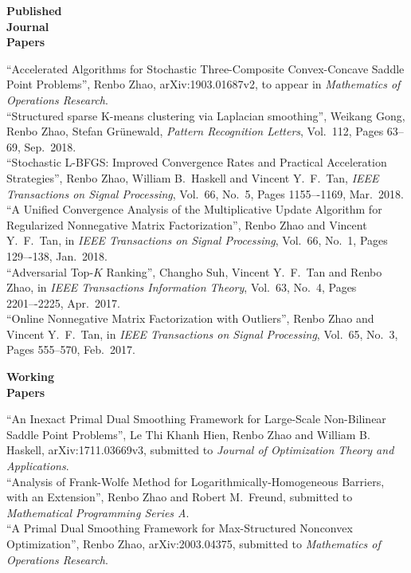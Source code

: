 \documentclass[11pt]{article}
\newcommand{\TSP}{IEEE Transactions on Signal Processing}
\newcommand{\TIT}{IEEE Transactions Information Theory}
\newcommand{\MOR}{Mathematics of Operations Research}
\newcommand{\MPA}{Mathematical Programming Series A}
\newcommand{\JOTA}{Journal of Optimization Theory and Applications}
\begin{document}
\begin{minipage}[t]{0.18\textwidth}
\textbf{Published\\ Journal \\Papers}
\end{minipage}
\begin{minipage}[t]{0.8\textwidth}
``Accelerated Algorithms for Stochastic Three-Composite Convex-Concave Saddle Point Problems'', {Renbo Zhao}, arXiv:1903.01687v2, to appear in {\em \MOR}.\\[.2cm]
``Structured sparse K-means clustering via Laplacian smoothing'', Weikang Gong, Renbo Zhao, Stefan Gr\"unewald, {\em Pattern Recognition Letters}, Vol.\ 112, Pages 63--69, Sep.\ 2018. \\[.2cm]
``Stochastic L-BFGS: Improved Convergence Rates and Practical Acceleration Strategies'', {Renbo Zhao}, William B.\ Haskell and Vincent Y.\ F.\ Tan,   {\em \TSP}, Vol.\ 66, No.\ 5, Pages 1155–-1169, Mar.\ 2018. %
\\[.2cm]
``A Unified Convergence Analysis of the Multiplicative Update Algorithm for Regularized Nonnegative Matrix Factorization'', {Renbo Zhao} and Vincent Y.\ F.\ Tan,  in {\em \TSP}, Vol.\ 66, No.\ 1, Pages 129–-138, Jan.\  2018. %
\\[.2cm]
``Adversarial Top-$K$ Ranking'', Changho Suh, Vincent Y.\ F.\ Tan and {Renbo Zhao},   in {\em \TIT}, Vol.\ 63, No.\ 4, Pages 2201–-2225, Apr.\ 2017. %
\\[.2cm]
``Online Nonnegative Matrix Factorization with Outliers'', {Renbo Zhao} and Vincent Y.\ F.\ Tan,  in {\em \TSP}, Vol.\ 65, No.\ 3, Pages 555--570, Feb.\ 2017. %
\\%
\end{minipage}

\begin{minipage}[t]{0.18\textwidth}
\textbf{Working\\ Papers}
\end{minipage}
\begin{minipage}[t]{0.8\textwidth}
``An Inexact Primal Dual Smoothing Framework for Large-Scale Non-Bilinear Saddle Point Problems'', Le Thi Khanh Hien, {Renbo Zhao} and William B. Haskell, arXiv:1711.03669v3, submitted to {\em \JOTA}.\\[.2cm]
``Analysis of Frank-Wolfe Method for Logarithmically-Homogeneous Barriers, with an Extension'', Renbo Zhao and Robert M.\ Freund, submitted to {\em \MPA}.\\[.2cm]
``A Primal Dual Smoothing Framework for Max-Structured Nonconvex Optimization'', Renbo Zhao, arXiv:2003.04375, submitted to {\em \MOR}. \\[.2cm]
\end{minipage}
\end{document}
